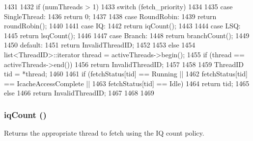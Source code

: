 \begin{DoxyCode}
1431 {
1432     if (numThreads > 1) {
1433         switch (fetch_priority) {
1434 
1435           case SingleThread:
1436             return 0;
1437 
1438           case RoundRobin:
1439             return roundRobin();
1440 
1441           case IQ:
1442             return iqCount();
1443 
1444           case LSQ:
1445             return lsqCount();
1446 
1447           case Branch:
1448             return branchCount();
1449 
1450           default:
1451             return InvalidThreadID;
1452         }
1453     } else {
1454         list<ThreadID>::iterator thread = activeThreads->begin();
1455         if (thread == activeThreads->end()) {
1456             return InvalidThreadID;
1457         }
1458 
1459         ThreadID tid = *thread;
1460 
1461         if (fetchStatus[tid] == Running ||
1462             fetchStatus[tid] == IcacheAccessComplete ||
1463             fetchStatus[tid] == Idle) {
1464             return tid;
1465         } else {
1466             return InvalidThreadID;
1467         }
1468     }
1469 }
\end{DoxyCode}
\hypertarget{classDefaultFetch_a4aff2ae442aa43bcb382774f7c429030}{
\subsubsection[{iqCount}]{ iqCount ()}}
\label{classDefaultFetch_a4aff2ae442aa43bcb382774f7c429030}
Returns the appropriate thread to fetch using the IQ count policy. 


